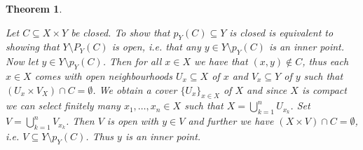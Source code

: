 \documentclass[11pt]{book}
\numberwithin{dummy}{section}
\newtheorem{theorem}{Theorem}[section]
\theoremstyle{nonumberbreak}
\newenvironment{pr}[1][]{\ifthenelse{\equal{#1}{}}{\proof}{\proof[#1]}\rm}{\endproof}
\begin{document}
\begin{spacing}{1.4}
\begin{theorem}
\begin{pr}
\begin{compactenum}
\item Let $C \subseteq X \times Y$ be closed. To show that $p_Y(C) \subseteq Y$ is closed is equivalent to showing that $Y \setminus P_Y(C)$ is open, i.e. that any $y \in Y \setminus p_Y(C)$ is an inner point. Now let $y \in Y\setminus p_Y(C)$. Then for all $x \in X$ we have that $(x,y) \notin C$, thus each $x \in X$ comes with open neighbourhoods $U_x \subseteq X$ of $x$ and $V_x \subseteq Y$ of $y$ such that $(U_x \times V_X) \cap C = \emptyset$. We obtain a cover $\{U_x\}_{x \in X}$ of $X$ and since $X$ is compact we can select finitely many $x_1, \ldots, x_n \in X$ such that $X= \bigcup_{k=1}^n U_{x_k}$. Set $V= \bigcup_{k=1}^n V_{x_k}$. Then $V$ is open with $y \in V$ and further we have $(X \times V) \cap C = \emptyset$, i.e. $V \subseteq Y\setminus p_Y(C)$. Thus $y$ is an inner point.


\end{compactenum}
\end{pr}
\end{theorem}
\end{spacing}
\end{document}
